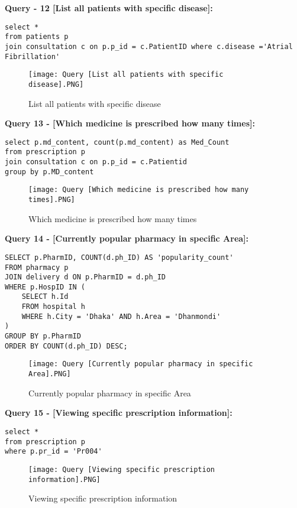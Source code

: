 \documentclass[11pt]{article}
\begin{document}
\textbf{Query - 12 [List all patients with specific disease]:}

\begin{lstlisting}
select * 
from patients p 
join consultation c on p.p_id = c.PatientID where c.disease ='Atrial Fibrillation' 
\end{lstlisting}

\begin{figure}[H]
    \centering
    \texttt{[image: Query [List all patients with specific disease].PNG]}
    \caption{List all patients with specific disease}
    \label{fig:1}
\end{figure}







\textbf{Query 13 - [Which medicine is prescribed how many times]:}

\begin{lstlisting}
select p.md_content, count(p.md_content) as Med_Count 
from prescription p 
join consultation c on p.p_id = c.Patientid 
group by p.MD_content 
\end{lstlisting}

\begin{figure}[H]
    \centering
    \texttt{[image: Query [Which medicine is prescribed how many times].PNG]}
    \caption{Which medicine is prescribed how many times}
    \label{fig:1}
\end{figure}



\textbf{Query 14 - [Currently popular pharmacy in specific Area]:}

\begin{lstlisting}
SELECT p.PharmID, COUNT(d.ph_ID) AS 'popularity_count' 
FROM pharmacy p 
JOIN delivery d ON p.PharmID = d.ph_ID 
WHERE p.HospID IN ( 
    SELECT h.Id 
    FROM hospital h 
    WHERE h.City = 'Dhaka' AND h.Area = 'Dhanmondi' 
) 
GROUP BY p.PharmID
ORDER BY COUNT(d.ph_ID) DESC; 
\end{lstlisting}


\begin{figure}[H]
    \centering
    \texttt{[image: Query [Currently popular pharmacy in specific Area].PNG]}
    \caption{Currently popular pharmacy in specific Area}
    \label{fig:1}
\end{figure}



\textbf{Query 15 - [Viewing specific prescription information]:}
\begin{lstlisting}
select * 
from prescription p 
where p.pr_id = 'Pr004' 
\end{lstlisting}
\begin{figure}[H]
    \centering
    \texttt{[image: Query [Viewing specific prescription information].PNG]}
    \caption{Viewing specific prescription information}
    \label{fig:1}
\end{figure}
\end{document}

